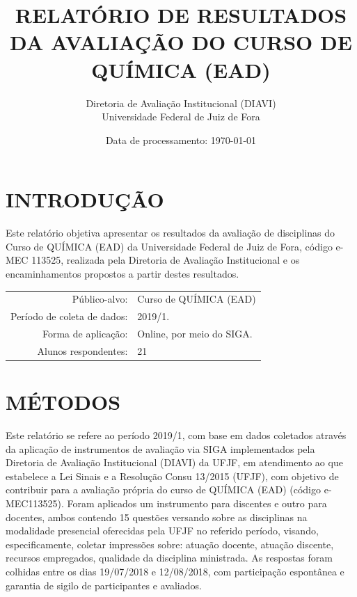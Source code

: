 \documentclass[a4paper,10pt]{article}
\date{Data de processamento: \today}
\begin{document}
\author{Diretoria de Avaliação Institucional (DIAVI) \\ Universidade Federal de Juiz de Fora}

\title{RELATÓRIO DE RESULTADOS DA AVALIAÇÃO DO CURSO DE QUÍMICA (EAD)}
\maketitle
\section{INTRODUÇÃO}
Este relatório objetiva apresentar os resultados da avaliação de disciplinas do Curso     de QUÍMICA (EAD) da Universidade Federal de Juiz de Fora, código e-MEC 113525, realizada pela     Diretoria de Avaliação Institucional e os encaminhamentos propostos a     partir destes resultados.

\begin{center}
\begin{tabularx}{\linewidth}{r|X}

Público-alvo:& Curso de QUÍMICA (EAD)\\

Período de coleta de dados:& 2019/1.\\

Forma de aplicação:& Online, por meio do SIGA.\\

Alunos respondentes:& 21\\
\end{tabularx}
\end{center}

\section{MÉTODOS}
Este relatório se refere ao período 2019/1, com base em dados     coletados através da aplicação de instrumentos de avaliação via SIGA     implementados pela Diretoria de Avaliação Institucional (DIAVI) da UFJF, em atendimento     ao que estabelece a Lei Sinais e a Resolução Consu 13/2015 (UFJF),     com objetivo de contribuir para a avaliação própria do curso de QUÍMICA (EAD) (código e-MEC113525). Foram aplicados um instrumento para discentes e outro para docentes, ambos contendo     15 questões versando sobre as disciplinas na modalidade presencial oferecidas pela UFJF no     referido período, visando, especificamente, coletar impressões sobre: atuação docente, atuação discente,     recursos empregados, qualidade da disciplina ministrada.     As respostas foram colhidas entre os dias 19/07/2018 e 12/08/2018, com participação espontânea e garantia de    sigilo de participantes e avaliados.
\end{document}
